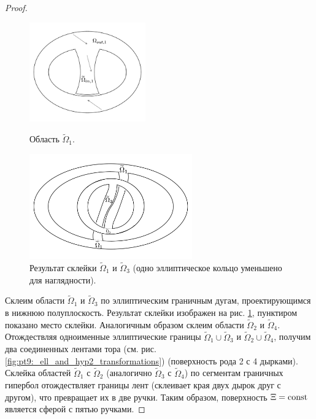 \begin{proof}
\begin{figure}[!htb]
\centering
\includegraphics[width=5cm]{images/ch4/section2/ell_and_hyp2.pdf}
    \caption{Область $\widetilde{\Omega}_1$.}
    \label{fig:pt9:_ell_and_hyp_2}
\endminipage\hfill
{}
\centering
\includegraphics[width=7cm]{images/ch4/section2/ell_and_hyp2_permutations.pdf}
    \caption{Результат склейки $\widetilde{\Omega}_1$ и $\widetilde{\Omega}_3$ (одно эллиптическое кольцо уменьшено для наглядности).}
    \label{fig:pt9:_ell_and_hyp2_permutations}
\endminipage\hfill
\end{figure}

Склеим области $\widetilde{\Omega}_1$ и $\widetilde{\Omega}_3$ по эллиптическим граничным дугам, проектирующимся в нижнюю полуплоскость. Результат склейки изображен на рис. \ref{fig:pt9:_ell_and_hyp2_permutations}, пунктиром показано место склейки.  Аналогичным образом склеим области $\widetilde{\Omega}_2$ и $\widetilde{\Omega}_4$. 
Отождествляя одноименные эллиптические границы  $\widetilde{\Omega}_1 \cup \widetilde{\Omega}_3$ и $\widetilde{\Omega}_2 \cup \widetilde{\Omega}_4$, получим два соединенных лентами тора (см. рис. \ref{fig:pt9:_ell_and_hyp2_transformations}) (поверхность рода 2 с 4 дырками). Склейка областей $\widetilde{\Omega}_1$ с $\widetilde{\Omega}_2$ (аналогично $\widetilde{\Omega}
_3$ с $\widetilde{\Omega}_4$) по сегментам граничных гипербол отождествляет границы лент (склеивает края двух дырок друг с другом), что превращает их в две ручки. Таким образом, поверхность $\Xi=\mathrm{const}$ является сферой с пятью ручками.


\end{proof}
